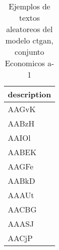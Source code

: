 \begin{table}[H]
\centering
\fontsize{8}{14}\selectfont
\caption{Ejemplos de textos aleatoreos del modelo ctgan, conjunto Economicos a-1}
\label{table-sample10-economicos-a-1-ctgan-text}
\begin{tabular}{|m{50em}|}
\hline
\rowcolor[gray]{0.8}
description \\
\hline AAGvK \\
\hline AABzH \\
\hline AAIOl \\
\hline AABEK \\
\hline AAGFe \\
\hline AABkD \\
\hline AAAUt \\
\hline AACBG \\
\hline AAASJ \\
\hline AACjP \\
\hline
\end{tabular}
\end{table}
